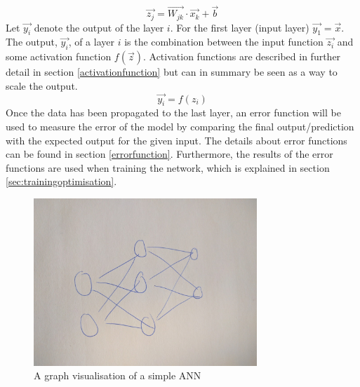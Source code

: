 \begin{equation}
    \vec{z_j} = \vec{W_{jk}} \cdot \vec{x_k} + \vec{b}
\end{equation}
Let $\vec{y_i}$ denote the output of the layer $i$. For the first layer (input layer) $\vec{y_1}=\vec{x}$. The output, $\vec{y_i}$, of a layer $i$ is the combination between the input function $\vec{z_i}$ and some activation function $f(\vec{z})$. Activation functions are described in further detail in section \ref{activationfunction} but can in summary be seen as a way to scale the output.
\begin{equation}
    \vec{y_i} = f(z_i)
\end{equation}
Once the data has been propagated to the last layer, an error function will be used to measure the error of the model by comparing the final output/prediction with the expected output for the given input. The details about error functions can be found in section \ref{errorfunction}. Furthermore, the results of the error functions are used when training the network, which is explained in section \ref{sec:trainingoptimisation}. 

\begin{figure}[h]
    \centering
    \includegraphics[width=0.75\textwidth]{figure/ann/ann}
    \caption{A graph visualisation of a simple ANN}
    \label{fig:simple_ann}
\end{figure}


